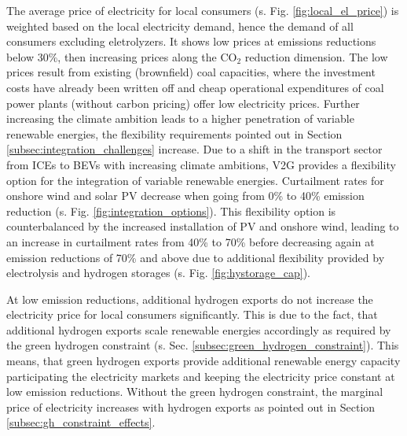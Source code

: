 The average price of electricity for local consumers (s. Fig. \ref{fig:local_el_price}) is weighted based on the local electricity demand, hence the demand of all consumers excluding eletrolyzers. 
It shows low prices at emissions reductions below 30\%, then increasing prices along the $\mathrm{CO_2}$ reduction dimension. The low prices result from existing (brownfield) coal capacities, where the investment costs have already been written off and cheap operational expenditures of coal power plants (without carbon pricing) offer low electricity prices. Further increasing the climate ambition leads to a higher penetration of variable renewable energies, the flexibility requirements pointed out in Section \ref{subsec:integration_challenges} increase. Due to a shift in the transport sector from ICEs to BEVs with increasing climate ambitions, V2G provides a flexibility option for the integration of variable renewable energies. Curtailment rates for onshore wind and solar PV decrease when going from 0\% to 40\% emission reduction (s. Fig. \ref{fig:integration_options}). This flexibility option is counterbalanced by the increased installation of PV and onshore wind, leading to an increase in curtailment rates from 40\% to 70\% before decreasing again at emission reductions of 70\% and above due to additional flexibility provided by electrolysis and hydrogen storages (s. Fig. \ref{fig:hystorage_cap}).




At low emission reductions, additional hydrogen exports do not increase the electricity price for local consumers significantly. This is due to the fact, that additional hydrogen exports scale renewable energies accordingly as required by the green hydrogen constraint (s. Sec. \ref{subsec:green_hydrogen_constraint}). This means, that green hydrogen exports provide additional renewable energy capacity participating the electricity markets and keeping the electricity price constant at low emission reductions. Without the green hydrogen constraint, the marginal price of electricity increases with hydrogen exports as pointed out in Section \ref{subsec:gh_constraint_effects}.

